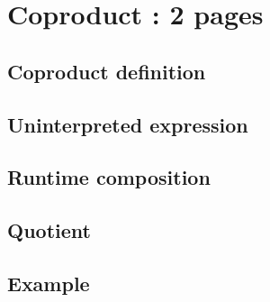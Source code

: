 \section{Coproduct : 2 pages}
\subsection*{Coproduct definition}
\subsection*{Uninterpreted expression}
\subsection*{Runtime composition}
\subsection*{Quotient}
\subsection*{Example}
